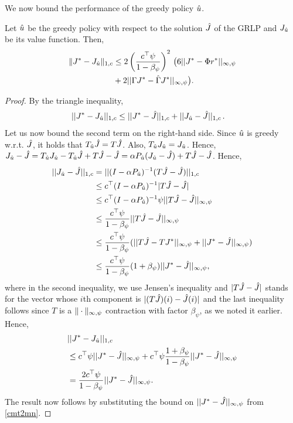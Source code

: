 We now bound the performance of the greedy policy $\hat{u}$.
\begin{theorem}
\label{polthe}
Let $\hat{u}$ be the greedy policy with respect to the solution $\hat{J}$ of the GRLP and $J_{\hat{u}}$ be its value function.
Then,
\begin{align}\label{polthebnd}
\norm{J^* - J_{\hu}}_{1,c}
&\leq 2\left(\frac{c^\top \psi}{1-\beta_{\psi}}\right)^2\, \big(6 ||J^*-\Phi r^*||_{\mn}
\nn\\&
+2||\Gamma J^*-\hg J^*||_{\mn}\big).
\end{align}
\end{theorem}
\begin{proof}
By the triangle inequality,
\begin{align*}
||J^*-J_{\hat{u}}||_{1,c}&\leq ||J^*-\hat{J}||_{1,c}+||J_{\hat{u}}-\hat{J}||_{1,c}\,.
\end{align*}
Let us now bound the second term on the right-hand side.
Since $\hat{u}$ is greedy w.r.t. $\hat{J}$, it holds that $T_{\hat{u}} \hat{J} = T \hat{J}$.
Also, $T_{\hat{u}} J_{\hat{u}} = J_{\hat{u}}$.
Hence, $J_{\hat{u}} - \hat{J} = T_{\hat{u}} J_{\hat{u}} - T_{\hat{u}} \hat{J} + T \hat{J} - \hat{J}
=\alpha P_{\hat{u}} (J_{\hat{u}}- \hat{J}) + T\hat{J} - \hat{J}$.
Hence,
\begin{align}\label{polderv}
||J_{\hu}-\hj||_{1,c}&=||(I-\alpha P_{\hu})^{-1}(T\hj-\hj)||_{1,c}\nn\\
&\leq c^\top(I-\alpha P_{\hu})^{-1}|T\hj-\hj|\nn\\
&\leq c^\top (I-\alpha P_{\hu})^{-1} \psi ||T\hj-\hj||_{\mn}\nn\\
&\leq \frac{c^\top \psi}{1-\beta_{\psi}}||T\hj-\hj||_{\mn}\nn\\
&\leq \frac{c^\top \psi}{1-\beta_{\psi}}(||T\hj-TJ^*||_{\mn} +||J^*- \hj||_{\mn})\nn\\
&\leq \frac{c^\top \psi}{1-\beta_{\psi}}(1+\beta_{\psi})||J^*- \hj||_{\mn},
\end{align}
where in the second inequality, we use Jensen's inequality and $|T\hat{J} - \hat{J}|$ stands for the 
vector whose $i$th component is $|(T\hat{J})(i) - \hat{J}(i)|$ and the last inequality follows
since $T$ is a $\|\cdot\|_{\infty,\psi}$ contraction with factor $\beta_{\psi}$, as we noted it earlier.
Hence,
\begin{align}
&||J^*-J_{\hat{u}}||_{1,c}\nonumber\\
&\leq c^\top \psi ||J^*-\hat{J}||_{\infty,\psi}+c^\top \psi\frac{1+\beta_\psi}{1-\beta_\psi}||J^*- \hat{J}||_{\infty,\psi}\nonumber\\
&=\frac{2c^\top \psi}{1-\beta_{\psi}}||J^*- \hat{J}||_{\infty,\psi}.
\end{align}
The result now follows by substituting the bound on $||J^*- \hat{J}||_{\infty,\psi}$ from \cref{cmt2mn}.
\end{proof}
